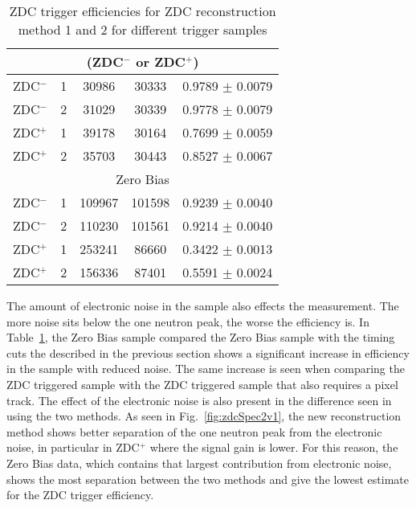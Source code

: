 \begin{table}
\begin{tabular}{|c|c|c|c|c|}
           \multicolumn{5}{|c|}{(ZDC$^{-}$ or ZDC$^{+}$)} \\ \hline 
           ZDC$^{-}$ & 1 & 30986 & 30333 & 0.9789 $\pm$ 0.0079 \\ \hline
           ZDC$^{-}$ & 2 & 31029 & 30339 & 0.9778 $\pm$ 0.0079 \\ \hline
           ZDC$^{+}$ & 1 & 39178 & 30164 & 0.7699 $\pm$ 0.0059 \\ \hline
           ZDC$^{+}$ & 2 & 35703 & 30443 & 0.8527 $\pm$ 0.0067 \\ \hline
           \multicolumn{5}{|c|}{ Zero Bias} \\ \hline 
           ZDC$^{-}$ & 1 & 109967  & 101598  & 0.9239 $\pm$ 0.0040 \\ \hline
           ZDC$^{-}$ & 2 & 110230  & 101561  & 0.9214 $\pm$ 0.0040 \\ \hline
           ZDC$^{+}$ & 1 & 253241  & 86660  & 0.3422 $\pm$ 0.0013 \\ \hline
           ZDC$^{+}$ & 2 & 156336  & 87401  & 0.5591 $\pm$ 0.0024 \\ \hline
        \end{tabular}
        \caption{ZDC trigger efficiencies for ZDC reconstruction method 1 and 
          2 for different trigger samples}
        \label{tab:zdcEfficiencySys}
      \end{table}
      
      The amount of electronic noise in the sample also effects the measurement.
      The more noise sits below the one neutron peak, the worse the efficiency 
        is. 
      In Table~\ref{tab:zdcEfficiencySys}, the Zero Bias sample compared the 
        Zero Bias sample with the timing cuts the described in the previous 
        section shows a significant increase in efficiency in the sample
        with reduced noise. 
      The same increase is seen when comparing the ZDC triggered sample with 
        the ZDC triggered sample that also requires a pixel track. 
      The effect of the electronic noise is also present in the difference seen
        in using the two methods.
      As seen in Fig.~\ref{fig:zdcSpec2v1}, the new reconstruction method 
        shows better separation of the one neutron peak from the electronic 
        noise, in particular in ZDC$^{+}$ where the signal gain is lower.
      For this reason, the Zero Bias data, which contains that largest 
        contribution from electronic noise, shows the most separation between 
        the two methods and give the lowest estimate for the ZDC trigger 
        efficiency.

